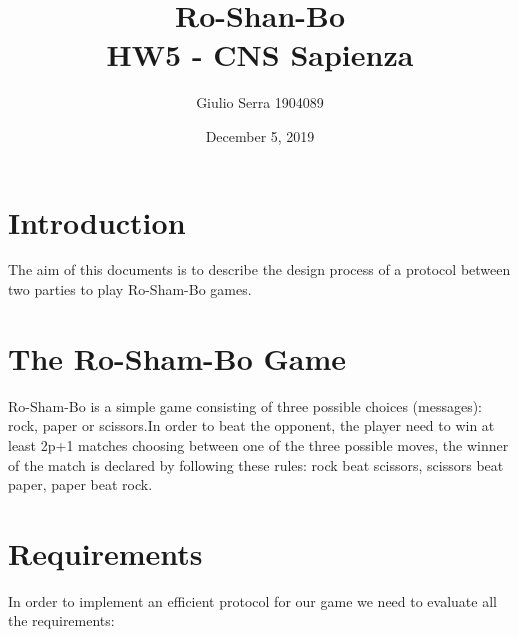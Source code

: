 \documentclass{article}
\begin{document}
\title{%
  Ro-Shan-Bo\\
  \large HW5 - CNS Sapienza}

\author{Giulio Serra 1904089}
\date{December 5, 2019}

\maketitle

\begin{titlepage}
\end{titlepage}

\tableofcontents

\begin{titlepage}
\end{titlepage}

\section{Introduction}\label{sec:intro}
The aim of this documents is to describe the design process of a protocol between two parties to play Ro-Sham-Bo games.

\section{The Ro-Sham-Bo Game}
Ro-Sham-Bo is a simple game consisting of three possible choices (messages): rock, paper or scissors.In order to beat the opponent, the player need to win at least 2p+1 matches choosing between one of the three possible moves, the winner of the match is declared by following these rules: rock beat scissors, scissors beat paper, paper beat rock.

\section{Requirements}
In order to implement an efficient protocol for our game we need to evaluate all the requirements:
\end{document}
